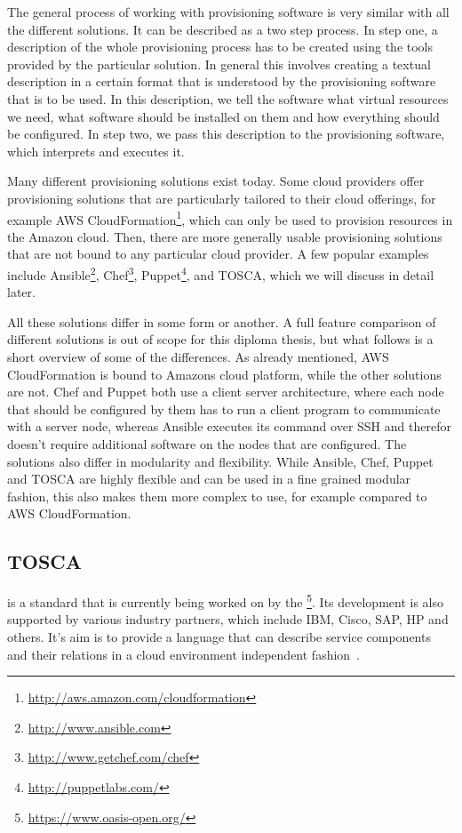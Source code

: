 The general process of working with provisioning software is very similar with all the different solutions.
It can be described as a two step process.
In step one, a description of the whole provisioning process has to be created using the tools provided by the particular solution.
In general this involves creating a textual description in a certain format that is understood by the provisioning software that is to be used.
In this description, we tell the software what virtual resources we need, what software should be installed on them and how everything should be configured.
In step two, we pass this description to the provisioning software, which interprets and executes it.

Many different provisioning solutions exist today.
Some cloud providers offer provisioning solutions that are particularly tailored to their cloud offerings, for example AWS CloudFormation\footnote{\url{http://aws.amazon.com/cloudformation}}, which can only be used to provision resources in the Amazon cloud.
Then, there are more generally usable provisioning solutions that are not bound to any particular cloud provider.
A few popular examples include Ansible\footnote{\url{http://www.ansible.com}}, Chef\footnote{\url{http://www.getchef.com/chef}}, Puppet\footnote{\url{http://puppetlabs.com/}}, and TOSCA, which we will discuss in detail later.

All these solutions differ in some form or another.
A full feature comparison of different solutions is out of scope for this diploma thesis, but what follows is a short overview of some of the differences.
As already mentioned, AWS CloudFormation is bound to Amazons cloud platform, while the other solutions are not.
Chef and Puppet both use a client server architecture, where each node that should be configured by them has to run a client program to communicate with a server node, whereas Ansible executes its command over SSH and therefor doesn't require additional software on the nodes that are configured.
The solutions also differ in modularity and flexibility. While Ansible, Chef, Puppet and TOSCA are highly flexible and can be used in a fine grained modular fashion, this also makes them more complex to use, for example compared to AWS CloudFormation.

\subsection{TOSCA}

 is a standard that is currently being worked on by the \footnote{\url{https://www.oasis-open.org/}}.
Its development is also supported by various industry partners, which include IBM, Cisco, SAP, HP and others.
It's aim is to provide a language that can describe service components and their relations in a cloud environment independent fashion~\autocite{tosca:spec}.

